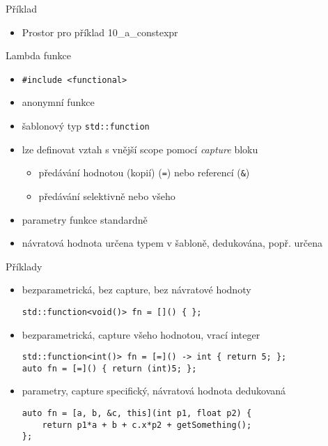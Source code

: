 \documentclass{beamer}
\begin{document}
\begin{xframe}{Příklad}
	\begin{itemize}
		\item Prostor pro příklad 10\_a\_constexpr
	\end{itemize}
\end{xframe}


\begin{xframe}{Lambda funkce}
	\begin{itemize}
		\item \texttt{\#include <functional>}
		\item anonymní funkce
		\item šablonový typ \texttt{std::function}
		\item lze definovat vztah s vnější scope pomocí \emph{capture} bloku
			\begin{itemize}
				\item předávání hodnotou (kopií) (\texttt{=}) nebo referencí (\texttt{\&})
				\item předávání selektivně nebo všeho
			\end{itemize}
		\item parametry funkce standardně
		\item návratová hodnota určena typem v šabloně, dedukována, popř. určena
	\end{itemize}
\end{xframe}

\begin{xframe}{Příklady}
	\begin{itemize}
		\item bezparametrická, bez capture, bez návratové hodnoty
\begin{lstlisting}[basicstyle=\fontsize{8}{9}\selectfont\ttfamily]
std::function<void()> fn = []() { };
\end{lstlisting}
		\item bezparametrická, capture všeho hodnotou, vrací integer
\begin{lstlisting}[basicstyle=\fontsize{8}{9}\selectfont\ttfamily]
std::function<int()> fn = [=]() -> int { return 5; };
auto fn = [=]() { return (int)5; };
\end{lstlisting}
		\item parametry, capture specifický, návratová hodnota dedukovaná
\begin{lstlisting}[basicstyle=\fontsize{8}{9}\selectfont\ttfamily]
auto fn = [a, b, &c, this](int p1, float p2) {
    return p1*a + b + c.x*p2 + getSomething();
};
\end{lstlisting}
	\end{itemize}
\end{xframe}
\end{document}
